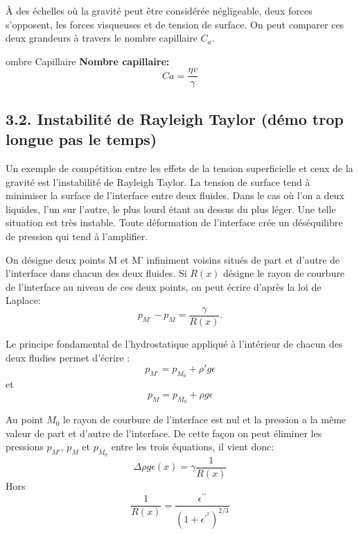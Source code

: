 \documentclass[french, a4paper, 10pt, twocolumn, landscape]{article}
\begin{document}
{\`A} des {\'e}chelles o{\`u} la gravit{\'e} peut {\^e}tre consid{\'e}r{\'e}e
n{\'e}gligeable, deux forces s'opposent, les forces visqueuses et de tension
de surface. On peut comparer ces deux grandeurs {\`a} travers le nombre\medskip
capillaire $C_a$.

\begin{definition}{ombre Capillaire}
  \textbf{Nombre capillaire:}
  \begin{equation}
    C a = \frac{\eta v}{\gamma}
  \end{equation}
\end{definition}


\subsection*{3.2. Instabilit{\'e} de Rayleigh Taylor (d{\'e}mo trop longue pas le
temps)}

Un exemple de comp{\'e}tition entre les effets de la tension superficielle et
ceux de la gravit{\'e} est l'instabilit{\'e} de Rayleigh Taylor. La tension de
surface tend {\`a} minimiser la surface de l'interface entre deux fluides.
Dans le cas o{\`u} l'on a deux liquides, l'un sur l'autre, le plus lourd
{\'e}tant au dessus du plus l{\'e}ger. Une telle situation est tr{\`e}s
instable. Toute d{\'e}formation de l'interface cr{\'e}e un
d{\'e}s{\'e}quilibre de pression qui tend {\`a} l'amplifier.\medskip

On d{\'e}signe deux points M et M' infiniment voisins situ{\'e}s de part et
d'autre de l'interface dans chacun des deux fluides. Si \textit{$R(x)$}
d{\'e}signe le rayon de courbure de l'interface au niveau de ces deux points,
on peut {\'e}crire d'apr{\`e}s la loi de Laplace:
\begin{equation}
  p_{M\prime} - p_M = \frac{\gamma}{R (x)}.  
\end{equation}

Le principe fondamental de l'hydrostatique appliqu{\'e} {\`a} l'int{\'e}rieur
de chacun des deux fludies permet d'{\'e}crire :
\begin{equation} 
  p_{M\prime} = p_{M_0} + \rho \prime g \epsilon
\end{equation}
et
\begin{equation} 
  p_M = p_{M_0} + \rho g \epsilon 
\end{equation}

Au point \textit{$M_0$} le rayon de courbure de l'interface est nul et la
pression a la m{\^e}me valeur de part et d'autre de l'interface. De cette
fa{\c c}on on peut {\'e}liminer les pressions $p_{M\prime}$, $p_M$ et $p_{M_0}$ entre les trois {\'e}quations, il vient donc:
\begin{equation}
  \Delta \rho g \epsilon (x) = \gamma \dfrac{1}{R (x)} 
\end{equation}
Hors 
\begin{equation} 
  \dfrac{1}{R (x)} = \dfrac{\epsilon^{\prime\prime}}{\left(1+\epsilon^{\prime^2}\right)^{2/3}}%
\end{equation}
\end{document}
